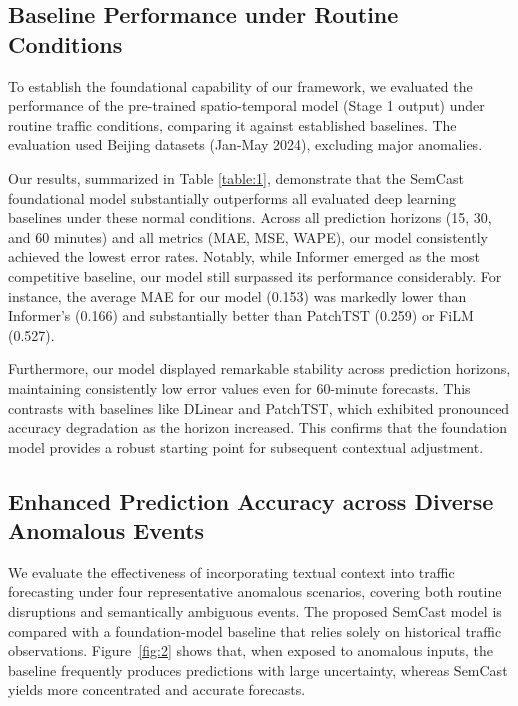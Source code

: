 \documentclass{article}
\begin{document}
\subsection{Baseline Performance under Routine Conditions}
\label{sec:routine}

To establish the foundational capability of our framework, we evaluated the performance of the pre-trained spatio-temporal model (Stage 1 output) under routine traffic conditions, comparing it against established baselines. The evaluation used Beijing datasets (Jan-May 2024), excluding major anomalies.

Our results, summarized in Table \ref{table:1}, demonstrate that the SemCast foundational model substantially outperforms all evaluated deep learning baselines under these normal conditions. Across all prediction horizons (15, 30, and 60 minutes) and all metrics (MAE, MSE, WAPE), our model consistently achieved the lowest error rates. Notably, while Informer emerged as the most competitive baseline, our model still surpassed its performance considerably. For instance, the average MAE for our model (0.153) was markedly lower than Informer's (0.166) and substantially better than PatchTST (0.259) or FiLM (0.527).

Furthermore, our model displayed remarkable stability across prediction horizons, maintaining consistently low error values even for 60-minute forecasts. This contrasts with baselines like DLinear and PatchTST, which exhibited pronounced accuracy degradation as the horizon increased. This confirms that the foundation model provides a robust starting point for subsequent contextual adjustment.



\subsection{Enhanced Prediction Accuracy across Diverse Anomalous Events}
\label{sec:anomaly}

We evaluate the effectiveness of incorporating textual context into traffic forecasting under four representative anomalous scenarios, covering both routine disruptions and semantically ambiguous events. The proposed SemCast model is compared with a foundation-model baseline that relies solely on historical traffic observations. Figure~\ref{fig:2} shows that, when exposed to anomalous inputs, the baseline frequently produces predictions with large uncertainty, whereas SemCast yields more concentrated and accurate forecasts.
\end{document}
